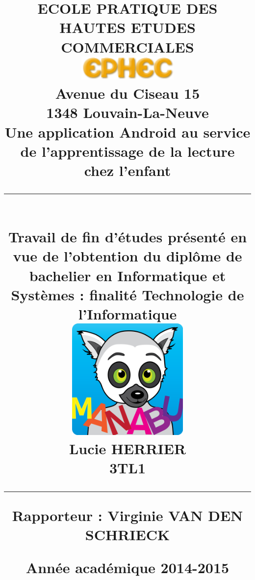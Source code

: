 \title{
\parbox{15cm}
{	
	\begin{center}
	\vspace{-1cm}
	\large ECOLE PRATIQUE DES HAUTES ETUDES COMMERCIALES\\
	\vspace{.5cm}
	\includegraphics[width=5cm]{ephec.png}\\
	Avenue du Ciseau 15\\
	1348 Louvain-La-Neuve\\
	\vspace{1cm}
	\sf\bfseries\Huge
	Une application Android au service de l'apprentissage de la lecture chez l'enfant 
	\rule{15cm}{1pt}\\
	\normalsize\mdseries Travail de fin d'études présenté en vue de l'obtention du diplôme de bachelier en Informatique et Systèmes : finalité Technologie de l'Informatique\\
	\vspace{.5cm}
	\includegraphics[width=6cm]{img/imanabu.png}\\
	\vspace{.5cm}
	\bfseries\LARGE
		Lucie HERRIER\\ \Large 3TL1
	\rule{15cm}{1pt}
	\end{center}
	\vspace{0.5cm}
	\bf\normalsize Rapporteur : Virginie VAN DEN SCHRIECK
	\begin{center}
	\vspace{1cm}
	\Large Année académique 2014-2015
	\end{center}
}} 

